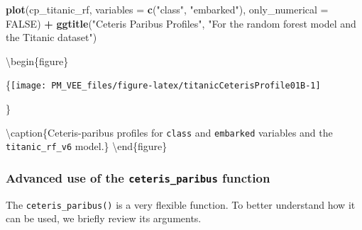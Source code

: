 \documentclass[12pt,]{krantz}
\newenvironment{Shaded}{\begin{snugshade}}{\end{snugshade}}
\newcommand{\DataTypeTok}[1]{\textcolor[rgb]{0.13,0.29,0.53}{#1}}
\newcommand{\KeywordTok}[1]{\textcolor[rgb]{0.13,0.29,0.53}{\textbf{#1}}}
\newcommand{\NormalTok}[1]{#1}
\newcommand{\OperatorTok}[1]{\textcolor[rgb]{0.81,0.36,0.00}{\textbf{#1}}}
\newcommand{\OtherTok}[1]{\textcolor[rgb]{0.56,0.35,0.01}{#1}}
\newcommand{\StringTok}[1]{\textcolor[rgb]{0.31,0.60,0.02}{#1}}
\theoremstyle{definition}
\theoremstyle{definition}
\theoremstyle{definition}
\theoremstyle{remark}
\begin{document}
\begin{Shaded}
\begin{Highlighting}[]
\KeywordTok{plot}\NormalTok{(cp_titanic_rf, }\DataTypeTok{variables =} \KeywordTok{c}\NormalTok{(}\StringTok{"class"}\NormalTok{, }\StringTok{"embarked"}\NormalTok{), }\DataTypeTok{only_numerical =} \OtherTok{FALSE}\NormalTok{) }\OperatorTok{+}
\StringTok{  }\KeywordTok{ggtitle}\NormalTok{(}\StringTok{"Ceteris Paribus Profiles"}\NormalTok{, }\StringTok{"For the random forest model and the Titanic dataset"}\NormalTok{)}
\end{Highlighting}
\end{Shaded}

\textbackslash{}begin\{figure\}

\{\centering \texttt{[image: PM\_VEE\_files/figure-latex/titanicCeterisProfile01B-1]}

\}

\textbackslash{}caption\{Ceteris-paribus profiles for \texttt{class} and
\texttt{embarked} variables and the \texttt{titanic\_rf\_v6}
model.\}\label{fig:titanicCeterisProfile01B} \textbackslash{}end\{figure\}

\hypertarget{advanced-use-of-the-ceteris_paribus-function}{%
\subsubsection{\texorpdfstring{Advanced use of the
\texttt{ceteris\_paribus}
function}{Advanced use of the ceteris\_paribus function}}\label{advanced-use-of-the-ceteris_paribus-function}}

The \texttt{ceteris\_paribus()} is a very flexible function. To better
understand how it can be used, we briefly review its arguments.
\end{document}
